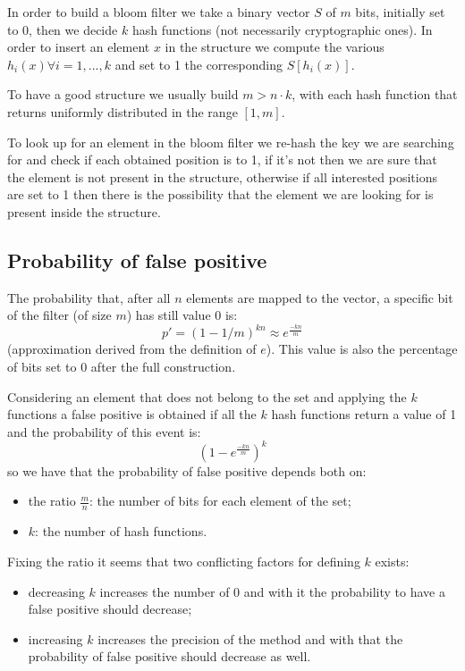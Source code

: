 In order to build a bloom filter we take a binary vector $S$ of $m$ bits, initially set to 0, then we decide $k$ hash functions (not necessarily cryptographic ones).
In order to insert an element $x$ in the structure we compute the various $h_{i}(x) \forall i = 1, ..., k$ and set to 1 the corresponding $S [h_{i}(x) ] $.

To have a good structure we usually build $m > n \cdot k$, with each hash function that returns uniformly distributed in the range $[1, m]$.

To look up for an element in the bloom filter we re-hash the key we are searching for and check if each obtained position is to 1, if it's not then we are sure that the element is not present in the structure, otherwise if all interested positions are set to 1 then there is the possibility that the element we are looking for is present inside the structure.

\subsection{Probability of false positive}
The probability that, after all $n$ elements are mapped to the vector, a specific bit of the filter (of size $m$) has still value 0 is:
$$
    p' = \left( 1 - 1/m \right)^{kn} \approx e^{\frac{-kn}{m}}
$$
(approximation derived from the definition of $e$).
This value is also the percentage of bits set to 0 after the full construction.

Considering an element that does not belong to the set and applying the $k$ functions a false positive is obtained if all the $k$ hash functions return a value of 1 and the probability of this event is:
$$
    \left( 1 - e^{\frac{-kn}{m}} \right)^k
$$
so we have that the probability of false positive depends both on:
\begin{itemize}
    \item the ratio $\frac{m}{n}$: the number of bits for each element of the set;
    \item $k$: the number of hash functions.
\end{itemize}

Fixing the ratio it seems that two conflicting factors for defining $k$ exists:
\begin{itemize}
    \item decreasing $k$ increases the number of 0 and with it the probability to have a false positive should decrease;
    \item increasing $k$ increases the precision of the method and with that the probability of false positive should decrease as well.
\end{itemize}

